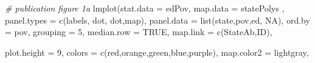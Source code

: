 \documentclass[
]{krantz}
\makeatletter
\newenvironment{Shaded}{\begin{snugshade}}{\end{snugshade}}
\newcommand{\AttributeTok}[1]{\textcolor[rgb]{0.61,0.61,0.61}{#1}}
\newcommand{\CommentTok}[1]{\textcolor[rgb]{0.37,0.37,0.37}{\textit{#1}}}
\newcommand{\ConstantTok}[1]{\textcolor[rgb]{0,0,0}{#1}}
\newcommand{\DecValTok}[1]{\textcolor[rgb]{0.06,0.06,0.06}{#1}}
\newcommand{\FunctionTok}[1]{\textcolor[rgb]{0,0,0}{#1}}
\newcommand{\NormalTok}[1]{#1}
\newcommand{\StringTok}[1]{\textcolor[rgb]{0.5,0.5,0.5}{#1}}
\newenvironment{kframe}{%
\medskip{}
\setlength{\fboxsep}{.8em}
 \def\at@end@of@kframe{}%
 \ifinner\ifhmode%
  \def\at@end@of@kframe{\end{minipage}}%
  \begin{minipage}{\columnwidth}%
 \fi\fi%
 \def\FrameCommand##1{\hskip\@totalleftmargin \hskip-\fboxsep
 \colorbox{shadecolor}{##1}\hskip-\fboxsep
     \hskip-\linewidth \hskip-\@totalleftmargin \hskip\columnwidth}%
 \MakeFramed {\advance\hsize-\width
   \@totalleftmargin\z@ \linewidth\hsize
   \@setminipage}}%
 {\par\unskip\endMakeFramed%
 \at@end@of@kframe}
\renewenvironment{Shaded}{\begin{kframe}}{\end{kframe}}
\makeatother
\begin{document}
\begin{Shaded}
\begin{Highlighting}[]
\CommentTok{\# publication figure 1a}
\FunctionTok{lmplot}\NormalTok{(}\AttributeTok{stat.data =}\NormalTok{ edPov,  }\AttributeTok{map.data =}\NormalTok{ statePolys ,}
    \AttributeTok{panel.types =} \FunctionTok{c}\NormalTok{(}\StringTok{\textquotesingle{}labels\textquotesingle{}}\NormalTok{, }\StringTok{\textquotesingle{}dot\textquotesingle{}}\NormalTok{, }\StringTok{\textquotesingle{}dot\textquotesingle{}}\NormalTok{,}\StringTok{\textquotesingle{}map\textquotesingle{}}\NormalTok{),}
    \AttributeTok{panel.data =} \FunctionTok{list}\NormalTok{(}\StringTok{\textquotesingle{}state\textquotesingle{}}\NormalTok{,}\StringTok{\textquotesingle{}pov\textquotesingle{}}\NormalTok{,}\StringTok{\textquotesingle{}ed\textquotesingle{}}\NormalTok{, }\ConstantTok{NA}\NormalTok{),}
    \AttributeTok{ord.by =} \StringTok{\textquotesingle{}pov\textquotesingle{}}\NormalTok{,  }
    \AttributeTok{grouping =} \DecValTok{5}\NormalTok{, }
    \AttributeTok{median.row =} \ConstantTok{TRUE}\NormalTok{,}
    \AttributeTok{map.link =} \FunctionTok{c}\NormalTok{(}\StringTok{\textquotesingle{}StateAb\textquotesingle{}}\NormalTok{,}\StringTok{\textquotesingle{}ID\textquotesingle{}}\NormalTok{),}
    
    \AttributeTok{plot.height =} \DecValTok{9}\NormalTok{,                            }
    \AttributeTok{colors =} \FunctionTok{c}\NormalTok{(}\StringTok{\textquotesingle{}red\textquotesingle{}}\NormalTok{,}\StringTok{\textquotesingle{}orange\textquotesingle{}}\NormalTok{,}\StringTok{\textquotesingle{}green\textquotesingle{}}\NormalTok{,}\StringTok{\textquotesingle{}blue\textquotesingle{}}\NormalTok{,}\StringTok{\textquotesingle{}purple\textquotesingle{}}\NormalTok{), }
    \AttributeTok{map.color2 =} \StringTok{\textquotesingle{}lightgray\textquotesingle{}}\NormalTok{,}
       

\end{Highlighting}
\end{Shaded}
\end{document}
